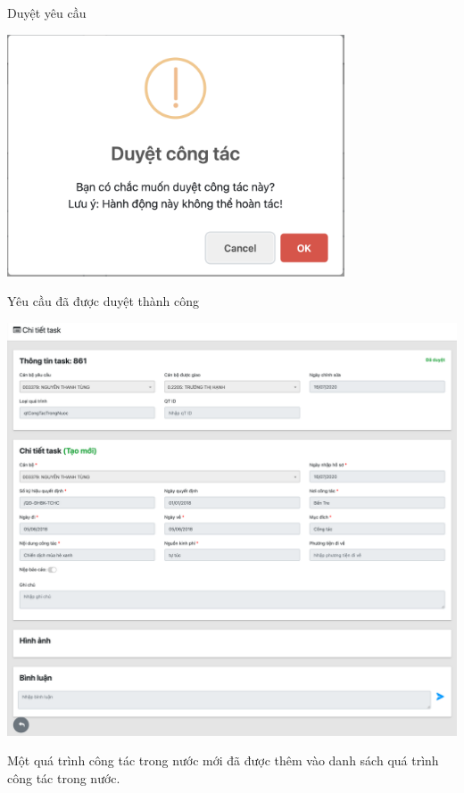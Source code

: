 Duyệt yêu cầu
\begin{center}
  \captionsetup{type=figure}
  \includegraphics[width=10cm]{img/test/confirmApprove.png}
\end{center}
Yêu cầu đã được duyệt thành công
\begin{center}
  \captionsetup{type=figure}
  \includegraphics[width=15cm]{img/test/approved.png}
\end{center}
Một quá trình công tác trong nước mới đã được thêm vào danh sách quá trình công tác trong nước.
